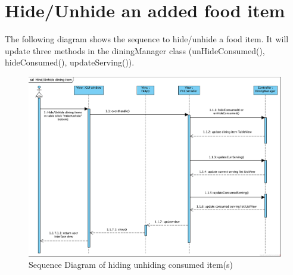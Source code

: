 \documentclass{scrreprt}
\begin{document}
\FloatBarrier

\newpage

\section{Hide/Unhide an added food item}

The following diagram shows the sequence to hide/unhide a food item. It will  update three methods in the diningManager class (unHideConsumed(), hideConsumed(), updateServing()).

\begin{figure}[!htbp]
\centering
\includegraphics[width=17.5cm]{pictures/sd-hideConsumed.png}
\caption{Sequence Diagram of hiding unhiding consumed item(s)}
\end{figure}

\FloatBarrier
\end{document}
